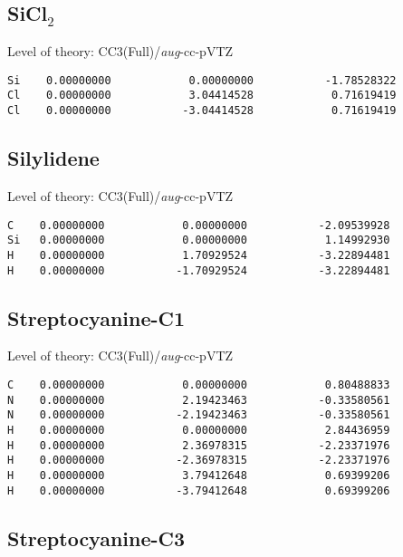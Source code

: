 \documentclass[journal=jctcce,manuscript=article,layout=traditional]{achemso}
\newcommand{\AVTZ}{\emph{aug}-cc-pVTZ}
\begin{document}
\subsection*{SiCl$_2$}

\begin{singlespace}
Level of theory: CC3(Full)/{\AVTZ}
\begin{verbatim}
Si    0.00000000            0.00000000           -1.78528322
Cl    0.00000000            3.04414528            0.71619419
Cl    0.00000000           -3.04414528            0.71619419
\end{verbatim}
\end{singlespace}

\subsection*{Silylidene}

\begin{singlespace}
Level of theory: CC3(Full)/{\AVTZ}
\begin{verbatim}
C    0.00000000            0.00000000           -2.09539928
Si   0.00000000            0.00000000            1.14992930
H    0.00000000            1.70929524           -3.22894481
H    0.00000000           -1.70929524           -3.22894481
\end{verbatim}
\end{singlespace}

\subsection*{Streptocyanine-C1}

\begin{singlespace}
Level of theory: CC3(Full)/{\AVTZ}
\begin{verbatim}
C    0.00000000            0.00000000            0.80488833
N    0.00000000            2.19423463           -0.33580561
N    0.00000000           -2.19423463           -0.33580561
H    0.00000000            0.00000000            2.84436959
H    0.00000000            2.36978315           -2.23371976
H    0.00000000           -2.36978315           -2.23371976
H    0.00000000            3.79412648            0.69399206
H    0.00000000           -3.79412648            0.69399206
\end{verbatim}
\end{singlespace}

\subsection*{Streptocyanine-C3}
\end{document}
